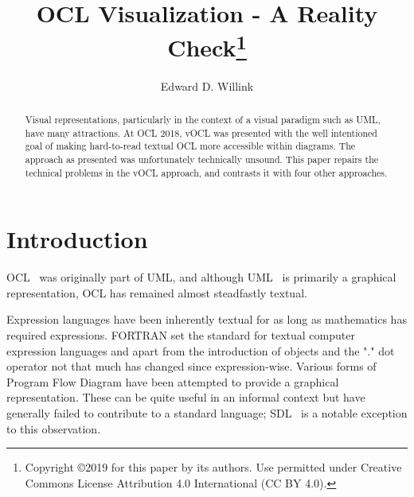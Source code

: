 \documentclass{llncs}
\begin{document}
%
\mainmatter              %
%
\title{OCL Visualization - A Reality Check\thanks{%
      Copyright \copyright 2019 for this paper by its authors.
      Use permitted under Creative Commons License Attribution
      4.0 International (CC BY 4.0).}}
%
%
\author{Edward D. Willink}
%
%
%


\maketitle              %

\begin{abstract}
Visual representations, particularly in the context of a visual paradigm such as UML, have many attractions. At OCL 2018, vOCL was presented with the well intentioned goal of making hard-to-read textual OCL more accessible within diagrams. The approach as presented was unfortunately technically unsound. This paper repairs the technical problems in the vOCL approach, and contrasts it with four other approaches.

\end{abstract}
%
\section{Introduction}
%
OCL~\cite{OCL-2.4} was originally part of UML, and although UML~\cite{UML-2.5} is primarily a graphical representation, OCL has remained almost steadfastly textual. %

Expression languages have been inherently textual for as long as mathematics has required expressions. FORTRAN set the standard for textual computer expression languages and apart from the introduction of objects and the "." dot operator not that much has changed since expression-wise.  Various forms of Program Flow Diagram have been attempted to provide a graphical representation. These can be quite useful in an informal context but have generally failed to contribute to a standard language; SDL~\cite{SDL} is a notable exception to this observation.
\end{document}
